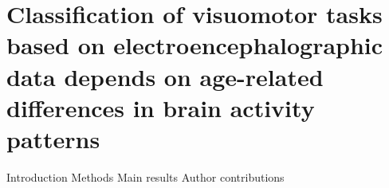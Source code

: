 \section{Classification of visuomotor tasks based on electroencephalographic data depends on age-related differences in brain activity patterns}


Introduction 
Methods 
Main results
Author contributions